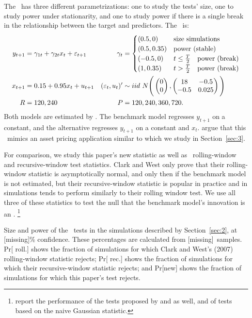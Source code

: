 \documentclass[12pt,fleqn]{article}
\providecommand\testsize{[missing]}
\providecommand\totalsims{[missing]}
\begin{document}
The \dgp\ has three different parametrizations: one to study the
tests' size, one to study power under stationarity, and one to study
power if there is a single break in the relationship between the
target and predictors.  The \dgp\ is:
\begin{align*}
  y_{t+1} &= \gamma_{1t} + \gamma_{2t} x_{t} + \varepsilon_{t+1} &
  \gamma_t &=
  \begin{cases}
    (0.5, 0)    & \text{size simulations} \\
    (0.5, 0.35) & \text{power (stable)} \\
    (-0.5, 0)    & t \leq \tfrac{T}{2} \quad \text{power (break)} \\
    (1, 0.35) & t > \tfrac{T}{2} \quad \text{power (break)}
  \end{cases}\\\nonumber
  x_{t+1} &= 0.15 + 0.95 x_{t} + u_{t+1} &
  (\varepsilon_t, u_t)' &\sim iid\ N\Bigg(\begin{pmatrix} 0 \\ 0
  \end{pmatrix}
   , \begin{pmatrix} 18 & -
    0.5 \\ -0.5 & 0.025 \end{pmatrix}\Bigg)
  \\ R &= 120, 240 & P &= 120, 240, 360, 720.
\end{align*}
Both models are estimated by \ols. The benchmark model regresses $y_{t+1}$
on a constant, and the alternative regresses $y_{t+1}$ on a constant and
$x_t$.  \citet{ClW:07} argue that this \dgp\ mimics an asset
pricing application similar to  which we study in
Section~\ref{sec:3}.

For comparison, we study this paper's new statistic as well as
\poscw\ rolling-window and recursive-window test statistics.  Clark and West
only prove that their rolling-window statistic is asymptotically
normal, and only then if the benchmark model is not estimated, but
their recursive-window statistic is popular in practice and in
simulations tends to perform similarly to their rolling window test.
We use all three of these statistics to test the null that the
benchmark model's innovation is an \mds.%
\footnote{\citet{ClW:07}
  report the performance of the tests proposed by \citet{CCS:01} and
  \citet{ClM:05} as well, and of tests based on the naive Gaussian
  statistic.} %

\begin{table}[tb]
  \centering
  
  \caption{Size and power of the \oos\ tests in the simulations
    described by Section~\ref{sec:2}, at
    \testsize\% confidence.  These percentages are calculated from \totalsims\
    samples.  Pr[ roll.] shows the fraction of simulations for
    which Clark and West's (2007) rolling-window statistic rejects;
    Pr[\allcaps{CW} rec.] shows the fraction of simulations for which
    their recursive-window statistic rejects; and Pr[new] shows the fraction of
    simulations for which this paper's test rejects.}
\label{tab:mc1}
\end{table}
\end{document}

